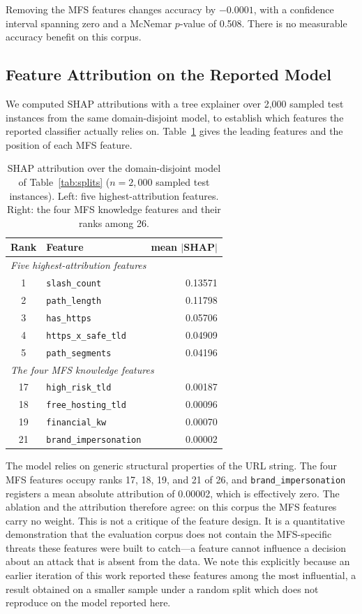 \documentclass[preprint,12pt,number]{elsarticle}
\begin{document}
Removing the MFS features changes accuracy by $-0.0001$, with a confidence interval spanning zero and a McNemar $p$-value of 0.508. There is no measurable accuracy benefit on this corpus.

\subsection{Feature Attribution on the Reported Model}
We computed SHAP attributions with a tree explainer over 2{,}000 sampled test instances from the same domain-disjoint model, to establish which features the reported classifier actually relies on. Table~\ref{tab:shap} gives the leading features and the position of each MFS feature.

\begin{table}[t]
\centering
\caption{SHAP attribution over the domain-disjoint model of Table~\ref{tab:splits} ($n=2{,}000$ sampled test instances). Left: five highest-attribution features. Right: the four MFS knowledge features and their ranks among 26.}
\label{tab:shap}
\small
\begin{tabular}{clr}
\toprule
Rank & Feature & mean $|$SHAP$|$ \\
\midrule
\multicolumn{3}{l}{\emph{Five highest-attribution features}} \\
1 & \texttt{slash\_count} & 0.13571 \\
2 & \texttt{path\_length} & 0.11798 \\
3 & \texttt{has\_https} & 0.05706 \\
4 & \texttt{https\_x\_safe\_tld} & 0.04909 \\
5 & \texttt{path\_segments} & 0.04196 \\
\midrule
\multicolumn{3}{l}{\emph{The four MFS knowledge features}} \\
17 & \texttt{high\_risk\_tld} & 0.00187 \\
18 & \texttt{free\_hosting\_tld} & 0.00096 \\
19 & \texttt{financial\_kw} & 0.00070 \\
21 & \texttt{brand\_impersonation} & 0.00002 \\
\bottomrule
\end{tabular}
\end{table}

The model relies on generic structural properties of the URL string. The four MFS features occupy ranks 17, 18, 19, and 21 of 26, and \texttt{brand\_impersonation} registers a mean absolute attribution of 0.00002, which is effectively zero. The ablation and the attribution therefore agree: on this corpus the MFS features carry no weight. This is not a critique of the feature design. It is a quantitative demonstration that the evaluation corpus does not contain the MFS-specific threats these features were built to catch---a feature cannot influence a decision about an attack that is absent from the data. We note this explicitly because an earlier iteration of this work reported these features among the most influential, a result obtained on a smaller sample under a random split which does not reproduce on the model reported here.
\end{document}
